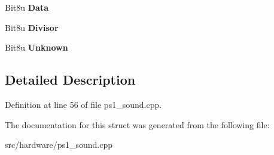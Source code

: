 \begin{DoxyCompactItemize}
\item 
\hypertarget{structPS1AUDIO_ad2adbdad413d1a2835dafc6a6c55a415}{Bit8u {\bfseries Data}}\label{structPS1AUDIO_ad2adbdad413d1a2835dafc6a6c55a415}

\item 
\hypertarget{structPS1AUDIO_a43fcbb7d2e0273c97ad8707146058cee}{Bit8u {\bfseries Divisor}}\label{structPS1AUDIO_a43fcbb7d2e0273c97ad8707146058cee}

\item 
\hypertarget{structPS1AUDIO_aaabafc6215d1483957642e97841058e3}{Bit8u {\bfseries Unknown}}\label{structPS1AUDIO_aaabafc6215d1483957642e97841058e3}

\end{DoxyCompactItemize}


\subsection{Detailed Description}


Definition at line 56 of file ps1\-\_\-sound.\-cpp.



The documentation for this struct was generated from the following file\-:\begin{DoxyCompactItemize}
\item 
src/hardware/ps1\-\_\-sound.\-cpp\end{DoxyCompactItemize}
